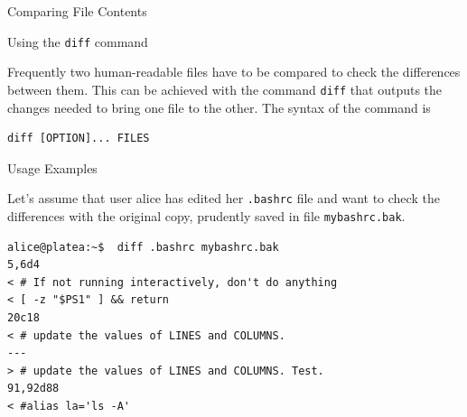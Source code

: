 \begin{frame}[t,fragile]{Comparing File Contents}

  \vspace{-0.3cm}
  \begin{block}{Using the \alert{\texttt{diff}} command}
    {\footnotesize
Frequently two human-readable files have to be compared to check the differences between them. This can be achieved with the command \alert{\texttt{diff}} that outputs the changes needed to bring one file to the other. The syntax of the command is


        \begin{lstlisting}
diff [OPTION]... FILES
        \end{lstlisting}

  Usage Examples
}


\vspace{0.1cm}
{\scriptsize
  Let's assume that user alice has edited her \texttt{.bashrc} file and want to check the differences with the original copy, prudently saved in file \texttt{mybashrc.bak}.
        \begin{lstlisting}
alice@platea:~$  diff .bashrc mybashrc.bak 
5,6d4
< # If not running interactively, don't do anything
< [ -z "$PS1" ] && return
20c18
< # update the values of LINES and COLUMNS.
---
> # update the values of LINES and COLUMNS. Test.
91,92d88
< #alias la='ls -A'
        \end{lstlisting}
}
  \end{block}
\end{frame}
